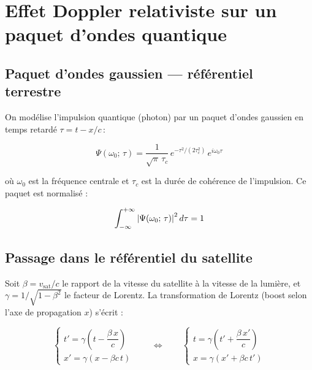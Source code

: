 \documentclass[12pt,a4paper]{article}
\begin{document}
\section*{Effet Doppler relativiste sur un paquet d'ondes quantique}

\subsection*{Paquet d'ondes gaussien — référentiel terrestre}

On modélise l'impulsion quantique (photon) par un paquet d'ondes gaussien en temps retardé
$\tau = t - x/c$\,:

\begin{equation}
    \Psi(\omega_0;\, \tau)
    = \frac{1}{\sqrt{\pi}\,\tau_c}
      \, e^{-\tau^2/(2\tau_c^2)}
      \, e^{i\omega_0 \tau}
    \label{eq:psi_earth}
\end{equation}

où $\omega_0$ est la fréquence centrale et $\tau_c$ est la durée de cohérence de l'impulsion.
Ce paquet est normalisé :

\begin{equation}
    \int_{-\infty}^{+\infty} \abs{\Psi(\omega_0;\, \tau)}^2 \, d\tau = 1
\end{equation}

\subsection*{Passage dans le référentiel du satellite}

Soit $\beta = v_\mathrm{sat}/c$ le rapport de la vitesse du satellite à la vitesse de la lumière,
et $\gamma = 1/\sqrt{1-\beta^2}$ le facteur de Lorentz. La transformation de Lorentz (boost
selon l'axe de propagation $x$) s'écrit :

\begin{equation}
    \begin{cases}
        t' = \gamma\!\left(t - \dfrac{\beta\, x}{c}\right) \\[8pt]
        x' = \gamma\!\left(x - \beta c\, t\right)
    \end{cases}
    \qquad \Longleftrightarrow \qquad
    \begin{cases}
        t  = \gamma\!\left(t' + \dfrac{\beta\, x'}{c}\right) \\[8pt]
        x  = \gamma\!\left(x' + \beta c\, t'\right)
    \end{cases}
    \label{eq:lorentz}
\end{equation}
\end{document}
